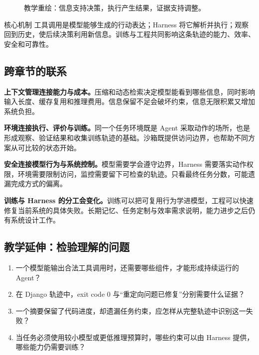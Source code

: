 \documentclass[11pt,a4paper]{article}
\begin{document}
\begin{figure}[H]\centering
{}
\caption{教学重绘：信息支持决策，执行产生结果，证据支持调整。}
\end{figure}

\begin{importantbox}{核心机制}
工具调用是模型能够生成的行动表达；Harness 将它解析并执行；观察回到历史，使后续决策利用新信息。训练与工程共同影响这条轨迹的能力、效率、安全和可靠性。
\end{importantbox}

\subsection{跨章节的联系}
\textbf{上下文管理连接能力与成本。}压缩和动态检索决定模型能看到哪些信息，同时影响输入长度、缓存复用和推理费用。信息保留不足会破坏约束，信息无限积累又增加系统负担。

\textbf{环境连接执行、评价与训练。}同一个任务环境既是 Agent 采取动作的场所，也是形成观察、验证结果和收集训练轨迹的基础。沙箱既提供访问边界，也帮助不同方案从可比较的状态开始。

\textbf{安全连接模型行为与系统控制。}模型需要学会遵守边界，Harness 需要落实动作权限，环境需要限制访问，监控需要留下可检查的轨迹。只看最终任务分数，可能遗漏完成方式的偏离。

\textbf{训练与 Harness 的分工会变化。}训练可以把可复用行为学进模型，工程可以快速修复当前系统的具体失败。长期记忆、任务定制与效率需求说明，能力进步之后仍有系统设计工作。

\clearpage
\subsection{教学延伸：检验理解的问题}
\begin{enumerate}
\item 一个模型能输出合法工具调用时，还需要哪些组件，才能形成持续运行的 Agent？
\item 在 Django 轨迹中，exit code 0 与“重定向问题已修复”分别需要什么证据？
\item 一个摘要保留了代码进度，却遗漏任务约束，应怎样从完整轨迹中识别这一失败？
\item 当任务必须使用较小模型或更低推理预算时，哪些约束可以由 Harness 提供，哪些能力仍需要训练？
\end{enumerate}
\end{document}
